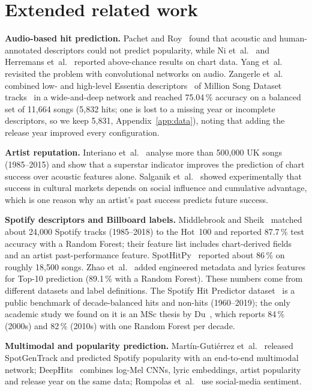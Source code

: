 \FloatBarrier
\section{Extended related work}\label{app:related}

\textbf{Audio-based hit prediction.} Pachet and Roy~\cite{pachet2008hit} found that
acoustic and human-annotated descriptors could not predict popularity, while Ni
et~al.~\cite{ni2011hit} and Herremans et~al.~\cite{herremans2014dance} reported
above-chance results on chart data. Yang et~al.~\cite{yang2017revisiting} revisited the
problem with convolutional networks on audio. Zangerle et~al.~\cite{zangerle2019hit}
combined low- and high-level Essentia descriptors~\cite{bogdanov2013essentia} of Million
Song Dataset tracks~\cite{bertinmahieux2011million} in a wide-and-deep network and reached
75.04\,\% accuracy on a balanced set of 11{,}664 songs (5{,}832 hits; one is lost to a missing year or
incomplete descriptors, so we keep 5{,}831, Appendix~\ref{app:data}), noting that adding the release year
improved every configuration.

\textbf{Artist reputation.} Interiano et~al.~\cite{interiano2018musical} analyse more
than 500{,}000 UK songs (1985--2015) and show that a superstar indicator improves the
prediction of chart success over acoustic features alone. Salganik
et~al.~\cite{salganik2006experimental} showed experimentally that success in cultural
markets depends on social influence and cumulative advantage, which is one reason why an
artist's past success predicts future success.

\textbf{Spotify descriptors and Billboard labels.} Middlebrook and
Sheik~\cite{middlebrook2019song} matched about 24{,}000 Spotify tracks (1985--2018) to the
Hot~100 and reported 87.7\,\% test accuracy with a Random Forest; their feature list
includes chart-derived fields and an artist past-performance feature. SpotHitPy~\cite{dimolitsas2023spothitpy}
reported about 86\,\% on roughly 18{,}500 songs. Zhao et~al.~\cite{zhao2023analysis}
added engineered metadata and lyrics features for Top-10 prediction (89.1\,\% with a
Random Forest). These numbers come from different datasets and label definitions.
The Spotify Hit Predictor dataset~\cite{ansari2020dataset} is a public benchmark of
decade-balanced hits and non-hits (1960--2019); the only academic study we found on it is
an MSc thesis by Du~\cite{du2022spotify}, which reports 84\,\% (2000s) and 82\,\% (2010s)
with one Random Forest per decade.

\textbf{Multimodal and popularity prediction.} Mart\'in-Guti\'errez
et~al.~\cite{martingutierrez2020multimodal} released SpotGenTrack and predicted Spotify
popularity with an end-to-end multimodal network; DeepHits~\cite{nofer2026deephits}
combines log-Mel CNNs, lyric embeddings, artist popularity and release year on the same
data; Rompolas et~al.~\cite{rompolas2024predicting} use social-media sentiment.

